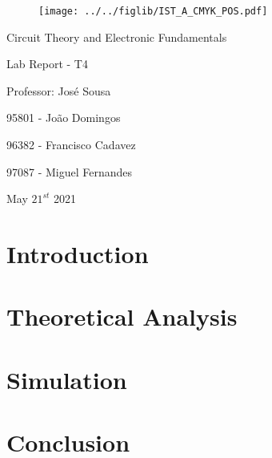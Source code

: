 \documentclass[11pt]{article}
\begin{document}
\thispagestyle{empty}
\begin{figure}[h]
	\centering
	\texttt{[image: ../../figlib/IST\_A\_CMYK\_POS.pdf]}
\end{figure}

\begin{center}
	\huge{Circuit Theory and Electronic Fundamentals}
	
	\huge{Lab Report - T4}
	
	\vspace{30pt}
	
	\large{Professor: José Sousa}
	
	\vspace{20pt}
	
	\large{95801 - João Domingos}
	
	\large{96382 - Francisco Cadavez}
	
	\large{97087 - Miguel Fernandes}
	
	\vspace{20pt}
	
	\large{May $21^{st}$ 2021}
\end{center}

\pagebreak
\tableofcontents

\pagebreak
\section{Introduction}
%

\pagebreak
\section{Theoretical Analysis}
\label{sec:theory}


\clearpage
\section{Simulation}


\pagebreak
\section{Conclusion}
\label{sec:conc}
%
\end{document}
